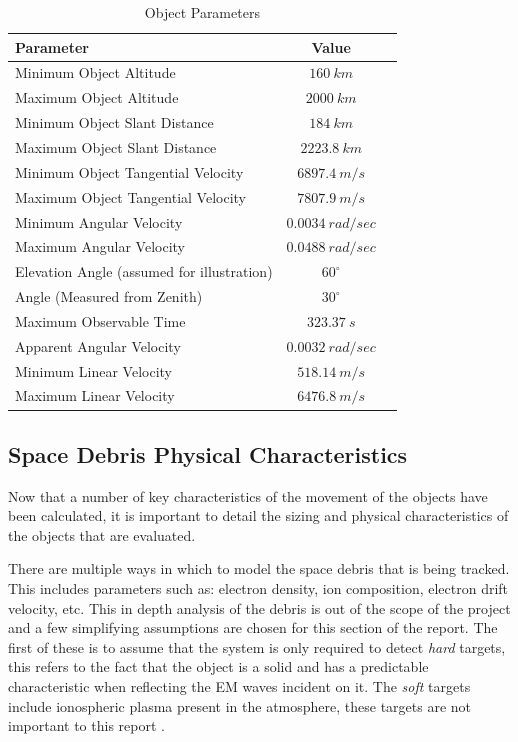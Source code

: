 \documentclass[11pt]{witseiepaper}
\begin{document}
\begin{bibunit}[witseie]
\begin{table}
    \caption{Object Parameters}
    \label{tab:ObjectParameters}
    \begin{center}
        \begin{tabular}{p{70mm}cp{70mm}}
            \hline 
            Parameter & Value \\
            \hline
            Minimum Object Altitude & $160~km$ \\
            Maximum Object Altitude & $2000~km$ \\
            Minimum Object Slant Distance & $184~km$ \\
            Maximum Object Slant Distance & $2223.8~km$ \\            
            Minimum Object Tangential Velocity & $6897.4~m/s$ \\
            Maximum Object Tangential Velocity & $7807.9~m/s$ \\
            Minimum Angular Velocity & $0.0034~rad/sec$ \\
            Maximum Angular Velocity & $0.0488~rad/sec$ \\
            Elevation Angle (assumed for illustration) & $60^{\circ}$ \\
            Angle (Measured from Zenith) & $30^{\circ}$ \\
            Maximum Observable Time & $323.37~s$ \\
            Apparent Angular Velocity & $0.0032~rad/sec$ \\
            Minimum Linear Velocity & $518.14~m/s$ \\
            Maximum Linear Velocity & $6476.8~m/s$ \\
        \end{tabular}
    \end{center}
\end{table}

\subsection{Space Debris Physical Characteristics} \label{sec:SpaceDebrisPhysicalCharacteristics}
Now that a number of key characteristics of the movement of the objects have been calculated, it is important to detail the sizing and physical characteristics of the objects that are evaluated.

There are multiple ways in which to model the space debris that is being tracked. This includes parameters such as: electron density, ion composition, electron drift velocity, etc. This in depth analysis of the debris is out of the scope of the project and a few simplifying assumptions are chosen for this section of the report.
The first of these is to assume that the system is only required to detect \textit{hard} targets, this refers to the fact that the object is a solid and has a predictable characteristic when reflecting the EM waves incident on it. The \textit{soft} targets include ionospheric plasma present in the atmosphere, these targets are not important to this report \cite{softTarget}.  


\end{bibunit}
\end{document}

